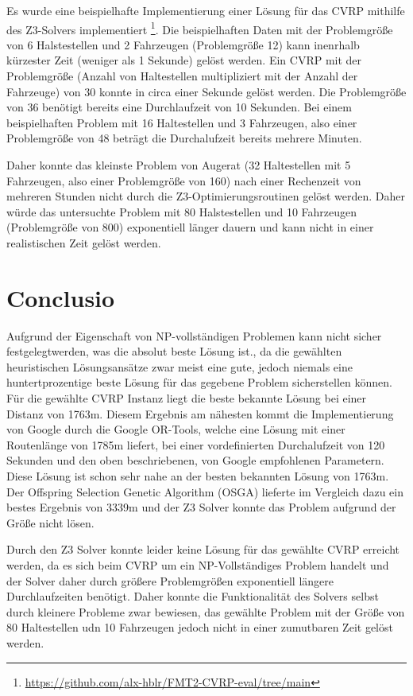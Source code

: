 \documentclass{IEEEtran}
\begin{document}
Es wurde eine beispielhafte Implementierung einer Lösung für das CVRP mithilfe des Z3-Solvers implementiert \footnote{\url{https://github.com/alx-hblr/FMT2-CVRP-eval/tree/main}}. Die beispielhaften Daten mit der Problemgröße von 6 Halstestellen und 2 Fahrzeugen (Problemgröße 12) kann inenrhalb kürzester Zeit (weniger als 1 Sekunde) gelöst werden. Ein CVRP mit der Problemgröße (Anzahl von Haltestellen multipliziert mit der Anzahl der Fahrzeuge) von 30 konnte in circa einer Sekunde gelöst werden. Die Problemgröße von 36 benötigt bereits eine Durchlaufzeit von 10 Sekunden. Bei einem beispielhaften Problem mit 16 Haltestellen und 3 Fahrzeugen, also einer Problemgröße von 48 beträgt die Durchalufzeit bereits mehrere Minuten. 

Daher konnte das kleinste Problem von Augerat (32 Haltestellen mit 5 Fahrzeugen, also einer Problemgröße von 160) nach einer Rechenzeit von mehreren Stunden nicht durch die Z3-Optimierungsroutinen gelöst werden. Daher würde das untersuchte Problem mit 80 Halstestellen und 10 Fahrzeugen (Problemgröße von 800) exponentiell länger dauern und kann nicht in einer realistischen Zeit gelöst werden.


\section{Conclusio}
Aufgrund der Eigenschaft von NP-vollständigen Problemen kann nicht  sicher festgelegtwerden, was die absolut beste Lösung ist., da die gewählten heuristischen Lösungsansätze zwar meist eine gute, jedoch niemals eine huntertprozentige beste Lösung für das gegebene Problem sicherstellen können. 
Für die gewählte CVRP Instanz liegt die beste bekannte Lösung bei einer Distanz von 1763m\cite{Heuristiclab}. Diesem Ergebnis am nähesten kommt die Implementierung von Google durch die Google OR-Tools, welche eine Lösung mit einer Routenlänge von 1785m liefert, bei einer vordefinierten Durchalufzeit von 120 Sekunden und den oben beschriebenen, von Google empfohlenen Parametern. Diese Lösung ist schon sehr nahe an der besten bekannten Lösung von 1763m. Der Offspring Selection Genetic Algorithm (OSGA) lieferte im Vergleich dazu ein bestes Ergebnis von 3339m und der Z3 Solver konnte das Problem aufgrund der Größe nicht lösen. 

Durch den Z3 Solver konnte leider keine Lösung für das gewählte CVRP erreicht werden, da es sich beim CVRP um ein NP-Vollständiges Problem handelt und der Solver daher durch größere Problemgrößen exponentiell längere Durchlaufzeiten benötigt. Daher konnte die Funktionalität des Solvers selbst durch kleinere Probleme zwar bewiesen, das gewählte Problem mit der Größe von 80 Haltestellen udn 10 Fahrzeugen jedoch nicht in einer zumutbaren Zeit gelöst werden. 

\printbibliography
\newpage
\end{document}

